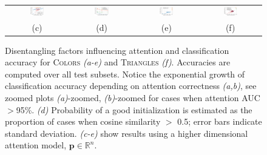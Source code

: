 \begin{figure}
\begin{center}
\begin{tabular}{cccc}
			{\includegraphics[width=0.24\textwidth, align=c, trim={0.3cm 0.4cm 0.3cm 0.3cm}, clip]{fig3/GIN_AUC_vs_Cos_dim3_16}} &
			\includegraphics[width=0.24\textwidth, align=c, trim={0.3cm 0.4cm 0.3cm 0.3cm}, clip]{fig3/Cheb_ACC_vs_Dim} &

			{\includegraphics[width=0.24\textwidth, align=c, trim={0.3cm 0.4cm 0.3cm 0cm}, clip]{fig3/colors_gin_sup_ada_top_Acc_vs_AUC_dim16}} &
			\includegraphics[width=0.24\textwidth, align=c, trim={0.3cm 0.4cm 0.3cm 0cm}, clip]{fig3/triangles_cheb_ACC_vs_Acc} \\
			(c) & (d) & (e)  & (f)
		\end{tabular}
	\end{center}
	\vspace{-18pt}
	\caption{\small Disentangling factors influencing attention and classification accuracy for \textsc{Colors} \textit{(a-e)} and \textsc{Triangles} \textit{(f)}. Accuracies are computed over all test subsets. Notice the exponential growth of classification accuracy depending on attention correctness \textit{(a,b)}, see zoomed plots \textit{(a)}-zoomed, \textit{(b)}-zoomed for cases when attention AUC$>$95\%. \textit{(d)} Probability of a good initialization is estimated as the proportion of cases when cosine similarity $>$ 0.5; error bars indicate standard deviation. \textit{(c-e)} show results using a higher dimensional attention model, $\mathbf{p} \in \mathbb{R}^n$.}
	\label{fig:accuracy_cos_sim}
\end{figure}

